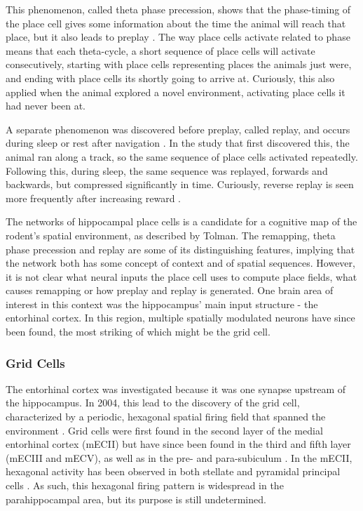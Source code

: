 \documentclass{article}
\begin{document}
    This phenomenon, called theta phase precession, shows that the phase-timing of the place cell gives some information about the time the animal will reach that place, but it also leads to preplay \parencite{Dragoi2011,Dragoi2013}. The way place cells activate related to phase means that each theta-cycle, a short sequence of place cells will activate consecutively, starting with place cells representing places the animals just were, and ending with place cells its shortly going to arrive at. Curiously, this also applied when the animal explored a novel environment, activating place cells it had never been at.

    A separate phenomenon was discovered before preplay, called replay, and occurs during sleep or rest after navigation \parencite{Wilson1994,Olafsdottir2016}. In the study that first discovered this, the animal ran along a track, so the same sequence of place cells activated repeatedly. Following this, during sleep, the same sequence was replayed, forwards and backwards, but compressed significantly in time. Curiously, reverse replay is seen more frequently after increasing reward \parencite{Ambrosa2013}.

    The networks of hippocampal place cells is a candidate for a cognitive map of the rodent's spatial environment, as described by Tolman. The remapping, theta phase precession and replay are some of its distinguishing features, implying that the network both has some concept of context and of spatial sequences. However, it is not clear what neural inputs the place cell uses to compute place fields, what causes remapping or how preplay and replay is generated. One brain area of interest in this context was the hippocampus' main input structure - the entorhinal cortex. In this region, multiple spatially modulated neurons have since been found, the most striking of which might be the grid cell.

    \subsubsection{Grid Cells} \label{grid cells}
    The entorhinal cortex was investigated because it was one synapse upstream of the hippocampus. In 2004, this lead to the discovery of the grid cell, characterized by a periodic, hexagonal spatial firing field that spanned the environment \parencite{Hafting2005}. Grid cells were first found in the second layer of the medial entorhinal cortex (mECII) but have since been found in the third and fifth layer (mECIII and mECV), as well as in the pre- and para-subiculum \parencite{Boccara2010}. In the mECII, hexagonal activity has been observed in both stellate and pyramidal principal cells \parencite{Rowland2018}. As such, this hexagonal firing pattern is widespread in the parahippocampal area, but its purpose is still undetermined.
    
\end{document}

